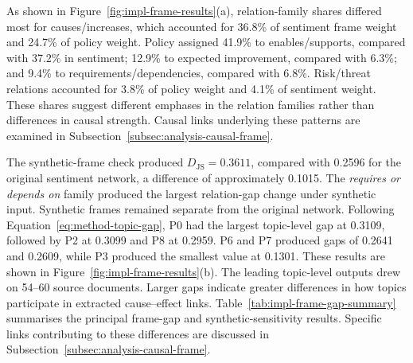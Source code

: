 As shown in Figure~\ref{fig:impl-frame-results}(a), relation-family shares differed
most for causes/increases, which accounted for 36.8\% of sentiment frame weight and
24.7\% of policy weight. Policy assigned 41.9\% to enables/supports, compared with
37.2\% in sentiment; 12.9\% to expected improvement, compared with 6.3\%; and 9.4\%
to requirements/dependencies, compared with 6.8\%. Risk/threat relations accounted
for 3.8\% of policy weight and 4.1\% of sentiment weight. These shares suggest
different emphases in the relation families rather than differences in
causal strength. Causal links underlying these patterns are examined
in Subsection~\ref{subsec:analysis-causal-frame}.


The synthetic-frame check produced \(D_{\mathrm{JS}}=0.3611\), compared with 0.2596
for the original sentiment network, a difference of approximately 0.1015. The
\textit{requires or depends on} family produced the largest relation-gap change under
synthetic input. Synthetic frames remained separate from the original network.
Following Equation~\ref{eq:method-topic-gap}, P0 had the largest topic-level gap at
0.3109, followed by P2 at 0.3099 and P8 at 0.2959. P6 and P7 produced gaps of 0.2641
and 0.2609, while P3 produced the smallest value at 0.1301. These results are shown
in Figure~\ref{fig:impl-frame-results}(b). The leading topic-level outputs drew on
54--60 source documents. Larger gaps indicate greater differences in how topics
participate in extracted cause--effect links. Table~\ref{tab:impl-frame-gap-summary}
summarises the principal frame-gap and synthetic-sensitivity results. Specific links
contributing to these differences are discussed in Subsection~\ref{subsec:analysis-causal-frame}.

